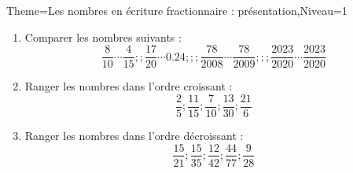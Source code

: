 \documentclass[a4paper,12pt]{article}
\begin{document}
\begin{Maquette}[Fiche]{Theme=Les nombres en écriture fractionnaire : présentation,Niveau=1}
\begin{exercice}
\end{exercice}

\begin{exercice}
\begin{enumerate}
\item Comparer les nombres suivants :
$$ \dfrac{8}{10}\cdots \dfrac{4}{15};; \dfrac{17}{20}\cdots 0.24 ;;; \dfrac{78}{2008}\cdots \dfrac{78}{2009} ;;; \dfrac{2023}{2020}\cdots \dfrac{2023}{2020} $$
\item Ranger les nombres dans l'ordre croissant :
$$\dfrac{2}{5};\dfrac{11}{15};\dfrac{7}{10};\dfrac{13}{30};\dfrac{21}{6} $$
\item Ranger les nombres dans l'ordre décroissant :
$$\dfrac{15}{21};\dfrac{15}{35};\dfrac{12}{42};\dfrac{44}{77};\dfrac{9}{28} $$
\end{enumerate}

\end{exercice}

\end{Maquette}
\end{document}
